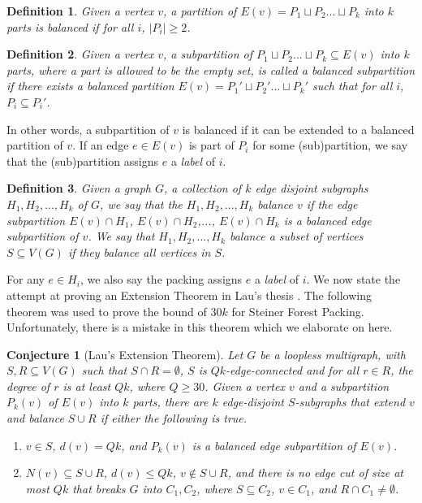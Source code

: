 \documentclass{article}
\newtheorem{definition}{Definition}[section]
\newtheorem{conjecture}{Conjecture}[section]
\begin{document}
\begin{definition}
    Given a vertex $v$, a partition of $E(v) = P_1 \sqcup P_2 ... \sqcup P_k$ into $k$ parts is balanced if for all $i$, $|P_i| \geq 2$. 
\end{definition}

\begin{definition}
    Given a vertex $v$, a subpartition of $P_1 \sqcup P_2 ... \sqcup P_k \subseteq E(v)$ into $k$ parts, where a part is allowed to be the empty set, is called a balanced subpartition if there exists a balanced partition $E(v) = P_1' \sqcup P_2' ... \sqcup P_k'$ such that for all $i$, $P_i \subseteq P_i'$. 
\end{definition}

In other words, a subpartition of $v$ is balanced if it can be extended to a balanced partition of $v$. If an edge $e \in E(v)$ is part of $P_i$ for some (sub)partition, we say that the (sub)partition assigns $e$ a \emph{label} of $i$. 

\begin{definition}
    Given a graph $G$, a collection of $k$ edge disjoint subgraphs $H_1,H_2,...,H_k$ of $G$, we say that the $H_1,H_2,...,H_k$ balance $v$ if the edge subpartition $E(v) \cap H_1$, $E(v) \cap H_2$,..., $E(v) \cap H_k$ is a balanced edge subpartition of $v$. We say that $H_1,H_2,...,H_k$ balance a subset of vertices $S \subseteq V(G)$ if they balance all vertices in $S$.
\end{definition}

For any $e \in H_i$, we also say the packing assigns $e$ a \emph{label} of $i$. We now state the attempt at proving an Extension Theorem in Lau's thesis \cite{lau-thesis}. The following theorem was used to prove the bound of $30k$ for Steiner Forest Packing. Unfortunately, there is a mistake in this theorem which we elaborate on here. 

\begin{conjecture}[Lau's Extension Theorem]
    Let $G$ be a loopless multigraph, with $S,R \subseteq V(G)$ such that $S \cap R = \emptyset$, $S$ is $Qk$-edge-connected and for all $r \in R$, the degree of $r$ is at least $Qk$, where $Q \geq 30$. Given a vertex $v$ and a subpartition $P_k(v)$ of $E(v)$ into $k$ parts, there are $k$ edge-disjoint $S$-subgraphs that extend $v$ and balance $S \cup R$ if either the following is true.  
    \begin{enumerate}
        \item $v \in S$, $d(v) = Qk$, and $P_k(v)$ is a balanced edge subpartition of $E(v)$. 
        \item $N(v) \subseteq S \cup R$, $d(v) \leq Qk$, $v \not\in S \cup R$, and there is no edge cut of size at most $Qk$ that breaks $G$ into $C_1,C_2$, where $S \subseteq C_2$, $v \in C_1$, and $R \cap C_1 \not= \emptyset$. 
    \end{enumerate}
\end{conjecture}
\end{document}
